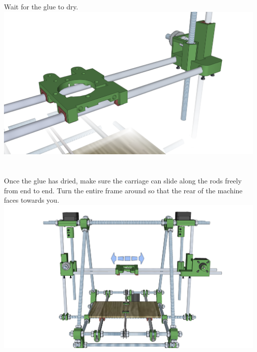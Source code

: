\documentclass[twoside,a4paper,titlepage]{memoir}
\begin{document}
	\section{}
	Wait for the glue to dry.\\
	\includegraphics[width=1\linewidth]{graphics/ch9_10.png}
	
	\section{}
	Once the glue has dried, make sure the carriage can slide along the rods freely from end to end. Turn
	the entire frame around so that the rear of the machine faces towards you.\\
	\includegraphics[width=1\linewidth]{graphics/ch9_11.png}
	
\end{document}
